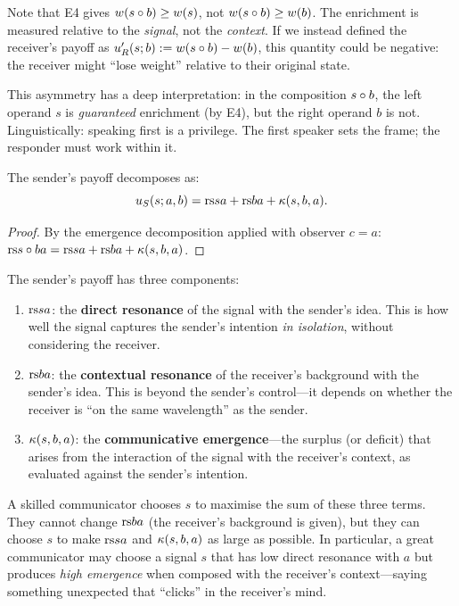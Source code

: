 \begin{remark}
\label{rem:asymmetry}
Note that E4 gives $w(s \circ b) \geq w(s)$, not $w(s \circ b) \geq w(b)$.
The enrichment is measured relative to the \emph{signal}, not the
\emph{context}.  If we instead defined the receiver's payoff as
$u_R'(s; b) := w(s \circ b) - w(b)$, this quantity could be negative: the
receiver might ``lose weight'' relative to their original state.

This asymmetry has a deep interpretation: in the composition $s \circ b$,
the left operand $s$ is \emph{guaranteed} enrichment (by E4), but the right
operand $b$ is not.  Linguistically: speaking first is a privilege.  The
first speaker sets the frame; the responder must work within it.
\end{remark}

\begin{proposition}
\label{prop:sender-decomposition}
The sender's payoff decomposes as:
\[
  u_S(s; a, b) = \mathrm{rs}{s}{a} + \mathrm{rs}{b}{a} + \kappa(s, b, a).
\]
\end{proposition}

\begin{proof}
By the emergence decomposition applied with observer $c = a$:
$\mathrm{rs}{s \circ b}{a} = \mathrm{rs}{s}{a} + \mathrm{rs}{b}{a} + \kappa(s, b, a)$.
\end{proof}

\begin{interpretation}
The sender's payoff has three components:
\begin{enumerate}
\item $\mathrm{rs}{s}{a}$: the \textbf{direct resonance} of the signal with the
  sender's idea.  This is how well the signal captures the sender's intention
  \emph{in isolation}, without considering the receiver.
\item $\mathrm{rs}{b}{a}$: the \textbf{contextual resonance} of the receiver's
  background with the sender's idea.  This is beyond the sender's control---it
  depends on whether the receiver is ``on the same wavelength'' as the sender.
\item $\kappa(s, b, a)$: the \textbf{communicative emergence}---the surplus
  (or deficit) that arises from the interaction of the signal with the
  receiver's context, as evaluated against the sender's intention.
\end{enumerate}

A skilled communicator chooses $s$ to maximise the sum of these three terms.
They cannot change $\mathrm{rs}{b}{a}$ (the receiver's background is given), but they
can choose $s$ to make $\mathrm{rs}{s}{a}$ and $\kappa(s, b, a)$ as large as
possible.  In particular, a great communicator may choose a signal $s$ that
has low direct resonance with $a$ but produces \emph{high emergence} when
composed with the receiver's context---saying something unexpected that
``clicks'' in the receiver's mind.
\end{interpretation}


